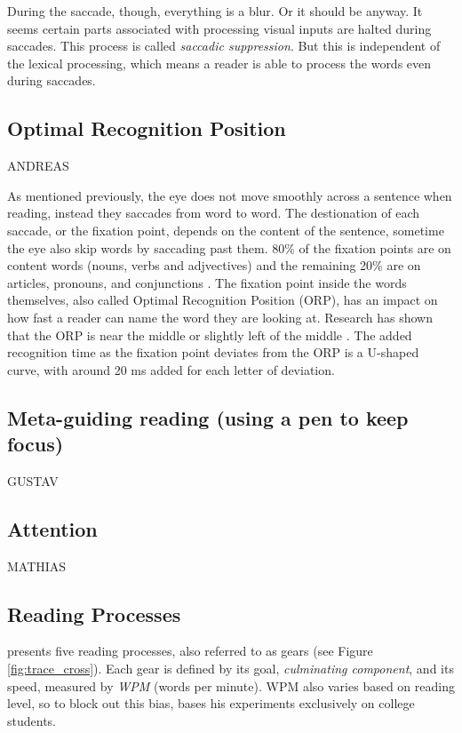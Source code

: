 During the saccade, though, everything is a blur. Or it should be anyway. It seems certain parts associated with processing visual inputs are halted during saccades. This process is called \textit{saccadic suppression}. But this is independent of the lexical processing, which means a reader is able to process the words even during saccades.

\subsection{Optimal Recognition Position} \label{ORP}
ANDREAS

As mentioned previously, the eye does not move smoothly across a sentence when reading, instead they saccades from word to word. The destionation of each saccade, or the fixation point, depends on the content of the sentence, sometime the eye also skip words by saccading past them. 80\% of the fixation points are on content words (nouns, verbs and adjvectives) and the remaining 20\% are on articles, pronouns, and conjunctions \cite{eysenck_cognitive_2010}. The fixation point inside the words themselves, also called Optimal Recognition Position (ORP), has an impact on how fast a reader can name the word they are looking at. Research has shown that the ORP is near the middle or slightly left of the middle \cite{oregan_optimal_1992, nazir_letter_1998, oregan_convenient_1984}. The added recognition time as the fixation point deviates from the ORP is a U-shaped curve, with around 20 ms added for each letter of deviation.


\subsection{Meta-guiding reading (using a pen to keep focus)}
GUSTAV

\subsection{Attention}
MATHIAS

\subsection{Reading Processes}
\cite{carver_reading_1992} presents five reading processes, also referred to as gears (see Figure \ref{fig:trace_cross}). Each gear is defined by its goal, \textit{culminating component}, and its speed, measured by \textit{WPM} (words per minute). WPM also varies based on reading level, so to block out this bias, \cite{carver_reading_1992} bases his experiments exclusively on college students.

